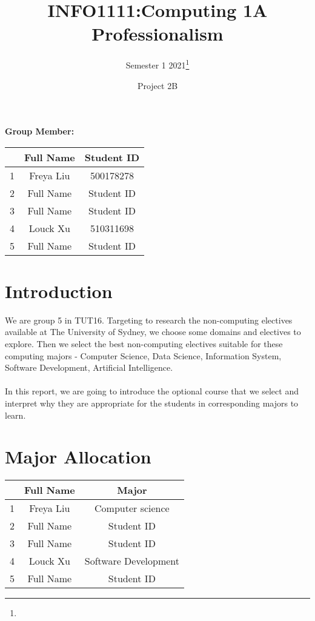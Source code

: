 \documentclass{article}
\title{INFO1111:Computing 1A Professionalism}
\author{Semester 1 2021\thanks{}}
\date{Project 2B}
\begin{document}
	
	
	\begin{titlepage}
		\maketitle
		\begin{title}
			\begin{center}
				\textbf{Group Member:}
			\end{center}
		\end{title}
		\begin{center}
			
			\begin{tabular}{|c|c|c|}
				\hline &Full Name& Student ID\\
				\hline 1& Freya Liu & 500178278  \\
				\hline 2&Full Name& Student ID  \\
				\hline 3&Full Name& Student ID  \\
				\hline 4&Louck Xu& 510311698  \\
				\hline 5&Full Name& Student ID  \\
				\hline
			\end{tabular}
		\end{center}
	\end{titlepage}
	
	\section{Introduction}
	We are group 5 in TUT16. Targeting to research the non-computing electives available at The University of Sydney, we choose some domains and electives to explore. Then we select the best non-computing electives suitable for these computing majors - Computer Science, Data Science, Information System, Software Development, Artificial Intelligence. \\
	\\
	In this report, we are going to introduce the optional course that we select and interpret why they are appropriate for the students in corresponding majors to learn.
	\section{Major Allocation}
	\begin{center}
		\begin{larger}
			\begin{tabular}{|c|c|c|}
				\hline &Full Name& Major\\
				\hline 1& Freya Liu & Computer science  \\
				\hline 2&Full Name& Student ID  \\
				\hline 3&Full Name& Student ID  \\
				\hline 4& Louck Xu & Software Development  \\
				\hline 5&Full Name& Student ID  \\
				\hline
			\end{tabular}
		\end{larger}
	\end{center}
	
\end{document}
